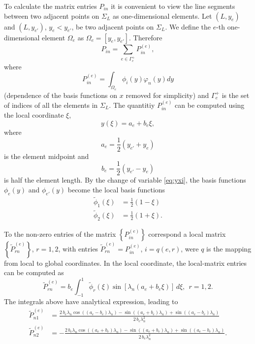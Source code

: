 \documentclass[11pt]{article}
\newcommand{\wt}[1]{\widetilde{#1}}
\begin{document}
To calculate the matrix entries $P_{in}$ it is convenient to view the line segments between two adjacent points on $\Sigma_L$  as one-dimensional elements. Let $(L,y_e)$ and $(L,y_{e'})$, $y_e < y_{e'}$, be two adjacent points on $\Sigma_L$. We define the $e$-th one-dimensional element $\Omega_e$ as $\Omega_e = [y_e, y_{e'}]$. Therefore
\begin{equation}
  \label{eq:20}
  P_{in} = \sum_{e \in \Gamma_e^+} P_{in}^{(e)},
\end{equation}
where
\begin{equation}
  \label{eq:28}
  P_{in}^{(e)} = \int_{\Omega_e} \phi_i(y)\varphi_n(y) dy
\end{equation}
(dependence of the basis functions on $x$ removed for simplicity) and $\Gamma_e^+$ is the set of indices of all the elements in $\Sigma_L$. The quantitiy $P_{in}^{(e)}$ can be computed using the local coordinate $\xi$,
\begin{equation}
  \label{eq:yxi}
  y(\xi) = a_e + b_e\xi,
\end{equation}
where
\begin{equation}
  \label{eq:24}
  a_e =  \frac{1}{2}(y_{e'} + y_e)
\end{equation}
is the element midpoint and
\begin{equation}
  \label{eq:25}
  b_e = \frac{1}{2}(y_{e'} - y_e)
\end{equation}
is half the element length. By the change of variable \eqref{eq:yxi}, the basis functions $\phi_e(y)$ and $\phi_{e'}(y)$ become the local basis functions
\begin{align}
  \wt{\phi}_1(\xi) &= \frac{1}{2}(1-\xi) \\
  \wt{\phi}_2(\xi) &= \frac{1}{2}(1+\xi).
\end{align}

To the non-zero entries of the matrix $\left\{P_{in}^{(e)}\right\}$ correspond a local matrix $\left\{\wt{P}_{rn}^{(e)}\right\}$, $r =1,2$, with entries $\wt{P}_{rn}^{(e)} = P_{in}^{(e)}$, $i=q(e,r)$, were $q$ is the mapping from local to global coordinates. In the local coordinate, the local-matrix entries can be computed as
\begin{equation}
  \label{eq:23}
  \wt{P}_{rn}^{(e)} = b_e \int_{-1}^1 \wt{\phi}_r(\xi)\sin[\lambda_n(a_e + b_e\xi)]\,d\xi,~~r = 1,2.
\end{equation}
The integrals above have analytical expression, leading to
\begin{align}
  \wt{P}_{n1}^{(e)} &= \frac{2 \, b_{e} \lambda_{n} \cos\left({\left(a_{e} - b_{e}\right)} \lambda_{n}\right) - \sin\left({\left(a_{e} + b_{e}\right)} \lambda_{n}\right) + \sin\left({\left(a_{e} - b_{e}\right)} \lambda_{n}\right)}{2 \, b_{e} \lambda_{n}^{2}} \\
  \wt{P}_{n2}^{(e)} &= -\frac{2 \, b_{e} \lambda_{n} \cos\left({\left(a_{e} + b_{e}\right)} \lambda_{n}\right) - \sin\left({\left(a_{e} + b_{e}\right)} \lambda_{n}\right) + \sin\left({\left(a_{e} - b_{e}\right)} \lambda_{n}\right)}{2 \, b_{e} \lambda_{n}^{2}}.
\end{align}




\clearpage



 
\end{document}
